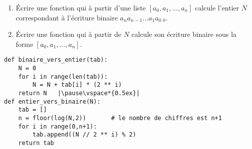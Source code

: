 \begin{frame}[fragile]
\begin{tp}
\begin{enumerate}
  \item \'Ecrire une fonction qui à partir d'une liste $[a_0,a_1,\ldots,a_n]$ calcule l'entier $N$ correspondant à l'écriture binaire 
  $a_n a_{n-1}\ldots a_1 a_0 \ _b$.
  \item \'Ecrire une fonction qui à partir de $N$ calcule son écriture binaire sous la forme $[a_0,a_1,\ldots,a_n]$.
\end{enumerate}
\end{tp}

\pause
\small

\begin{algo}[binaire.py (1) \& (2)]
\vspace*{-1ex}
\begin{lstlisting}
def binaire_vers_entier(tab):
    N = 0
    for i in range(len(tab)):
        N = N + tab[i] * (2 ** i)
    return N   |\pause\vspace*{0.5ex}|
def entier_vers_binaire(N):
    tab = []
    n = floor(log(N,2))       # le nombre de chiffres est n+1
    for i in range(0,n+1):
        tab.append((N // 2 ** i) % 2)
    return tab
\end{lstlisting} 
\vspace*{-1ex}
\end{algo}

\end{frame}


